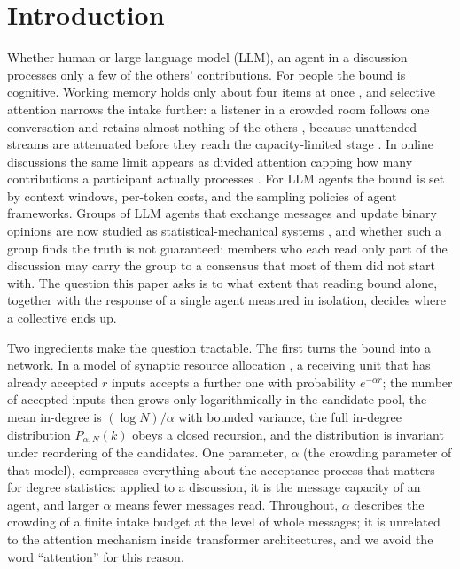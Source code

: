 \documentclass[11pt]{article}
\begin{document}
\section{Introduction}\label{sec:intro}

Whether human or large language model (LLM), an agent in a discussion
processes only a few of the others' contributions. For people the bound is
cognitive. Working memory holds only about four items at once
\citep{Cowan2001,LuckVogel1997}, and selective attention narrows the intake
further: a listener in a crowded room follows one conversation and retains
almost nothing of the others \citep{Cherry1953}, because unattended streams
are attenuated before they reach the capacity-limited stage
\citep{Treisman1964}. In online discussions the same limit appears as
divided attention capping how many contributions a participant actually
processes \citep{HodasLerman2012}. For LLM agents the bound is set by
context windows, per-token costs, and the sampling policies of agent
frameworks.
Groups of LLM agents that exchange messages and update binary opinions are
now studied as statistical-mechanical systems \citep{El2026}, and whether
such a group finds the truth is not guaranteed: members who each read only
part of the discussion may carry the group to a consensus that most of them
did not start with. The question this paper
asks is to what extent that reading bound alone, together with the response
of a single agent measured in isolation, decides where a collective ends up.

Two ingredients make the question tractable. The first turns the bound into
a network. In a model of synaptic resource allocation \citep{SciRepCrowding},
a receiving unit that has already accepted $r$ inputs accepts a further one
with probability $e^{-\alpha r}$; the number of accepted inputs then grows
only logarithmically in the candidate pool, the mean in-degree is
$(\log N)/\alpha$ with bounded variance, the full in-degree distribution
$P_{\alpha,N}(k)$ obeys a closed recursion, and the distribution is
invariant under reordering of the candidates. One parameter, $\alpha$ (the
crowding parameter of that model), compresses everything about the acceptance process that matters for degree
statistics: applied to a discussion, it is the message capacity of an agent,
and larger $\alpha$ means fewer messages read. Throughout, $\alpha$
describes the crowding of a finite intake budget at the level of whole
messages; it is unrelated to the attention mechanism inside transformer
architectures, and we avoid the word ``attention'' for this reason.
\end{document}
